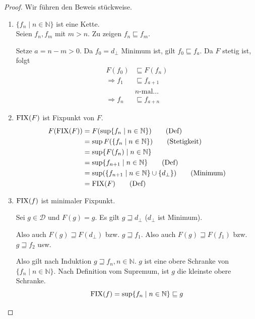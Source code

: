 \begin{proof}
    Wir führen den Beweis stückweise.
    \begin{enumerate}
        \item $\{ f_n \mid n \in \mathbb{N} \}$ ist eine Kette. \\
            Seien $f_n, f_m$ mit $m > n$. Zu zeigen $f_n \sqsubseteq f_m$.

            Setze $a = n - m > 0$. Da $f_0 = d_{\bot}$ Minimum ist, gilt $f_0 \sqsubseteq f_a$. Da $F$ stetig ist, folgt
            \begin{align*}
                F(f_0) & \sqsubseteq F(f_n) \\
                \Rightarrow f_1 & \sqsubseteq f_{a+1} \\
                & n\text{-mal} \dots \\
                \Rightarrow f_n & \sqsubseteq f_{a+n}
            \end{align*}

        \item $\operatorname{FIX}(F)$ ist Fixpunkt von $F$.
            \begin{align*}
                F(\operatorname{FIX}(F)) & = F(\sup \{f_n \mid n \in \mathbb{N} \}) \tag{Def} \\
                & = \sup F(\{f_n \mid n \in \mathbb{N} \}) \tag{Stetigkeit} \\
                & = \sup \{F(f_n) \mid n \in \mathbb{N} \} \\
                & = \sup \{f_{n+1} \mid n \in \mathbb{N} \} \tag{Def} \\
                & = \sup (\{f_{n+1} \mid n \in \mathbb{N} \} \cup \{ d_{\bot} \}) \tag{Minimum} \\
                & = \operatorname{FIX}(F) \tag{Def}
            \end{align*}

        \item $\operatorname{FIX}(f)$ ist minimaler Fixpunkt.

            Sei $g \in \mathcal{D}$ und $F(g) = g$. Es gilt $g \sqsupseteq d_{\bot}$ ($d_{\bot}$ ist Minimum).

            Also auch $F(g) \sqsupseteq F(d_{\bot})$ bzw. $g \sqsupseteq f_1$. Also auch $F(g) \sqsupseteq F(f_1)$ bzw. $g \sqsupseteq f_2$ usw.

            Also gilt nach Induktion $g \sqsupseteq f_n, n \in \mathbb{N}$. $g$ ist eine obere Schranke von $\{f_n \mid n \in \mathbb{N} \}$. Nach Definition vom Supremum, ist $g$ die kleinste obere Schranke.
            \[ \operatorname{FIX}(f) = \sup \{ f_n \mid n \in \mathbb{N} \} \sqsubseteq g \]
    \end{enumerate}
\end{proof}

